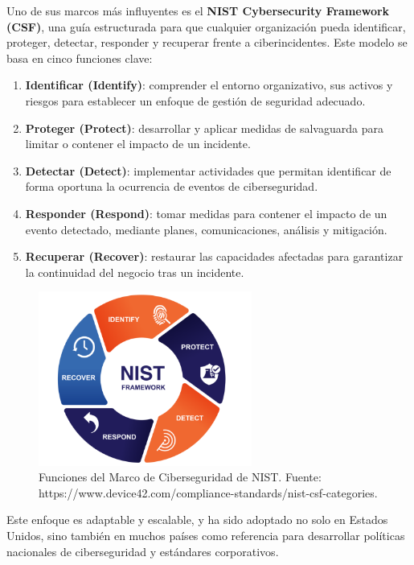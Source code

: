 \documentclass[a4paper, 10pt]{article}
\begin{document}
Uno de sus marcos más influyentes es el \textbf{NIST Cybersecurity Framework (CSF)}, una guía estructurada para que cualquier organización pueda identificar, proteger, detectar, responder y recuperar frente a ciberincidentes. Este modelo se basa en cinco funciones clave:
\begin{enumerate}
\item \textbf{Identificar (Identify)}: comprender el entorno organizativo, sus activos y riesgos para establecer un enfoque de gestión de seguridad adecuado.
\item \textbf{Proteger (Protect)}: desarrollar y aplicar medidas de salvaguarda para limitar o contener el impacto de un incidente.
\item \textbf{Detectar (Detect)}: implementar actividades que permitan identificar de forma oportuna la ocurrencia de eventos de ciberseguridad.
\item \textbf{Responder (Respond)}: tomar medidas para contener el impacto de un evento detectado, mediante planes, comunicaciones, análisis y mitigación.
\item \textbf{Recuperar (Recover)}: restaurar las capacidades afectadas para garantizar la continuidad del negocio tras un incidente.
\end{enumerate}

\begin{figure}[H]
\centering
\includegraphics[width=7cm]{images/nist_framework.png}
\caption{Funciones del Marco de Ciberseguridad de NIST. Fuente: https://www.device42.com/compliance-standards/nist-csf-categories.}
\label{fig:nist-framework}
\end{figure}

Este enfoque es adaptable y escalable, y ha sido adoptado no solo en Estados Unidos, sino también en muchos países como referencia para desarrollar políticas nacionales de ciberseguridad y estándares corporativos.

\par\vspace{0.5cm}
\end{document}
